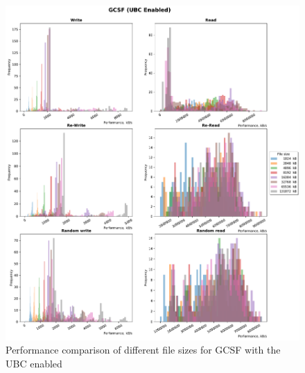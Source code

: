 \begin{figure}[!htb]
	\label{fig:bench_gcsf_with_cache}
	\begin{center}
		\includegraphics[width=1.0\textwidth]{figures.nosync/benchmarking/GCSF/GCSF-UBC Enabled-hist.pdf}
	\end{center}
	\caption{Performance comparison of different file sizes for GCSF with the UBC enabled}
\end{figure}

